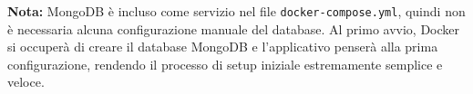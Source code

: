 \textbf{Nota:} MongoDB è incluso come servizio nel file \texttt{docker-compose.yml}, quindi non è necessaria alcuna configurazione manuale del database. Al primo avvio, Docker si occuperà di creare il database MongoDB e l'applicativo penserà alla prima configurazione, rendendo il processo di setup iniziale estremamente semplice e veloce.